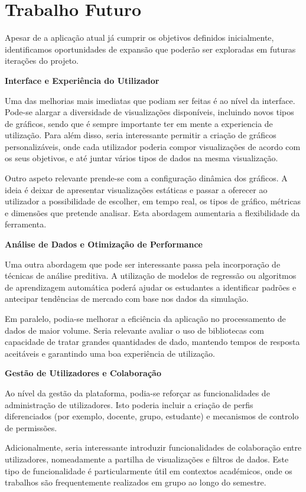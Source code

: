 \section{Trabalho Futuro}

Apesar de a aplicação atual já cumprir os objetivos definidos inicialmente, identificamos oportunidades de expansão que poderão ser exploradas em futuras iterações do projeto. 

\textbf{Interface e Experiência do Utilizador}

Uma das melhorias mais imediatas que podiam ser feitas é ao nível da interface. Pode-se alargar a diversidade de visualizações disponíveis, incluindo novos tipos de gráficos, sendo que é sempre importante ter em mente a experiencia de utilização. Para além disso, seria interessante permitir a criação de gráficos personalizáveis, onde cada utilizador poderia compor visualizações de acordo com os seus objetivos, e até juntar vários tipos de dados na mesma visualização.

Outro aspeto relevante prende-se com a configuração dinâmica dos gráficos. A ideia é deixar de apresentar visualizações estáticas e passar a oferecer ao utilizador a possibilidade de escolher, em tempo real, os tipos de gráfico, métricas e dimensões que pretende analisar. Esta abordagem aumentaria a flexibilidade da ferramenta.

\textbf{Análise de Dados e Otimização de Performance}

Uma outra abordagem que pode ser interessante passa pela incorporação de técnicas de análise preditiva. A utilização de modelos de regressão ou algoritmos de aprendizagem automática poderá ajudar os estudantes a identificar padrões e antecipar tendências de mercado com base nos dados da simulação.

Em paralelo, podia-se melhorar a eficiência da aplicação no processamento de dados de maior volume. Seria relevante avaliar o uso de bibliotecas com capacidade de tratar grandes quantidades de dado,  mantendo tempos de resposta aceitáveis e garantindo uma boa experiência de utilização.

\textbf{Gestão de Utilizadores e Colaboração}

Ao nível da gestão da plataforma, podia-se reforçar as funcionalidades de administração de utilizadores. Isto poderia incluir a criação de perfis diferenciados (por exemplo, docente, grupo, estudante) e mecanismos de controlo de permissões.

Adicionalmente, seria interessante introduzir funcionalidades de colaboração entre utilizadores, nomeadamente a partilha de visualizações e filtros de dados. Este tipo de funcionalidade é particularmente útil em contextos académicos, onde os trabalhos são frequentemente realizados em grupo ao longo do semestre.

